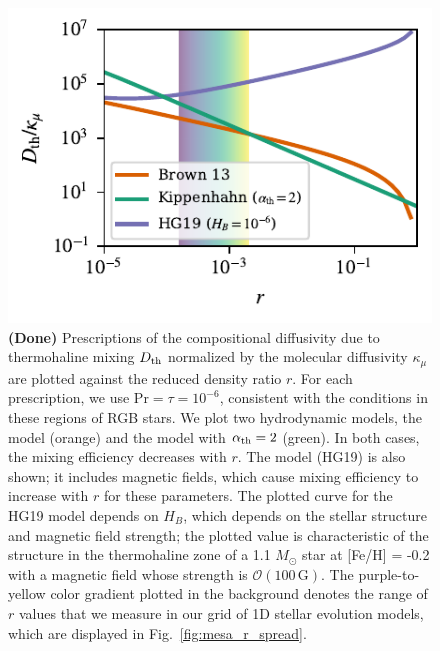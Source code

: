 \begin{figure}
    \centering
    \includegraphics[width=\columnwidth]{Nu_models_comparison.pdf}
    \caption{ {\bf{(Done)}}
    Prescriptions of the compositional diffusivity due to thermohaline mixing $D_{\rm th}$ normalized by the molecular diffusivity $\kappa_{\mu}$ are plotted against the reduced density ratio $r$. For each prescription, we use $\mathrm{Pr} = \tau = 10^{-6}$, consistent with the conditions in these regions of RGB stars.
    We plot two hydrodynamic models, the \citet{brown_etal_2013} model (orange) and the \citet{kippenhahn_etal_1980} model with $\alpha_{\rm th} = 2$ (green). In both cases, the mixing efficiency decreases with $r$.
    The \citet{harrington} model (HG19) is also shown; it includes magnetic fields, which cause mixing efficiency to increase with $r$ for these parameters.
    The plotted curve for the HG19 model depends on $H_B$, which depends on the stellar structure and magnetic field strength; the plotted value is characteristic of the structure in the thermohaline zone of a 1.1 $M_\odot$ star at [Fe/H] = -0.2 with a magnetic field whose strength is $\mathcal{O}(100 \,\mathrm{G})$.
    The purple-to-yellow color gradient plotted in the background denotes the range of $r$ values that we measure in our grid of 1D stellar evolution models, which are displayed in Fig.~\ref{fig:mesa_r_spread}.
    }
    \label{fig:parameterization_compare}
\end{figure}
